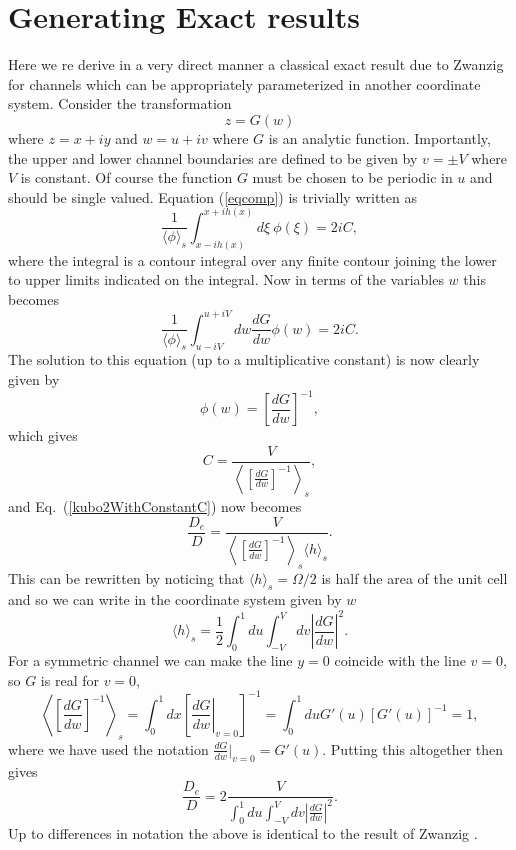 \documentclass[pre,showpacs,preprintnumbers,amsmath,amssymb,superscriptaddress]{revtex4-1}
\begin{document}
{{\section{Generating Exact results}
\label{Sec5}
Here we re derive in a very direct manner a classical exact result due to Zwanzig \cite{zwa1982}
for channels which can be appropriately parameterized in another coordinate system.
Consider the transformation
\begin{equation}
z = G(w)
\end{equation}
where $z = x+iy$ and $w=u+iv$ where $G$ is an analytic function.  Importantly, the upper and lower channel boundaries are defined to be given by $v=\pm V$ where $V$ is constant. Of course 
the function $G$ must be chosen to be periodic in $u$ and should be single valued. Equation 
(\ref{eqcomp}) is trivially written as
\begin{equation}
\frac{1}{\langle \phi\rangle_s}\int^{x+ih(x)}_{x-ih(x)} d\xi\ \phi(\xi) = 2iC\label{eqcomp2},
\end{equation}
where the integral is a contour integral over any finite contour joining the lower to upper limits indicated on the integral. Now in terms of the variables $w$ this becomes
\begin{equation}
\frac{1}{\langle \phi\rangle_s}\int^{u+iV}_{u-iV} dw \frac{dG}{dw} \phi(w) = 2iC.
\end{equation}
The solution to this equation (up to a multiplicative constant) is now clearly given by
\begin{equation}
\phi(w) = \left[\frac{dG}{dw}\right]^{-1},
\end{equation}
which gives
\begin{equation}
C = \frac{V}{\left\langle\left[\frac{dG}{dw}\right]^{-1}\right\rangle_s},
\end{equation}
and Eq.~(\ref{kubo2WithConstantC}) now becomes
\begin{equation}
\frac{D_e}{D}=\frac{V}{\left\langle\left[\frac{dG}{dw}\right]^{-1}\right\rangle_s\langle h\rangle_s}.
\end{equation}
This can be rewritten by noticing that $\langle h\rangle_s=\Omega/2$ is half the area of the unit cell and so we can write in the coordinate system given by $w$ 
\begin{equation}
\langle h\rangle_s=\frac{1}{2}\int_0^1 du \int_{-V}^{V} dv \left|\frac{dG}{dw}\right|^2.
\end{equation}
For a symmetric channel we can make the line $y=0$ coincide with the line $v=0$, so $G$ is real for $v=0$, 
\begin{equation}
\left\langle\left[\frac{dG}{dw}\right]^{-1}\right\rangle_s= \int_0^1 dx \left[\left.\frac{dG}{dw}\right|_{v=0}\right]^{-1} = \int_0^1 du G'(u)[G'(u)]^{-1} = 1,
\end{equation}
where we have used the notation $\frac{dG}{dw}|_{v=0} = G'(u)$. Putting this altogether then gives 
\begin{equation}
\frac{D_e}{D}=2\frac{V}{\int_0^1 du \int_{-V}^{V} dv |\frac{dG}{dw}|^2}. \label{exactzwanzig}
\end{equation}
Up to differences in notation the above is identical to the result of Zwanzig \cite{zwa1982}.


}}
\end{document}
